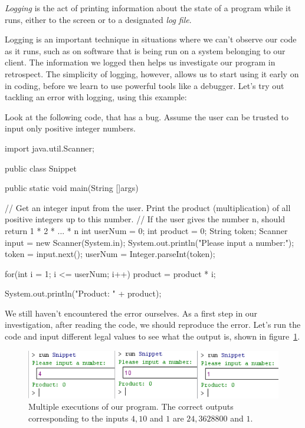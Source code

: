 \begin{definition}
\emph{Logging} is the act of printing information about the state of a program while it runs, either to the screen or to a designated \emph{log file}. 
\end{definition}

Logging is an important technique in situations where we can't observe our code as it runs, such as on software that is being run on a system belonging to our client. The information we logged then helps us investigate our program in retrospect. The simplicity of logging, however, allows us to start using it early on in coding, before we learn to use powerful tools like a debugger. Let's try out tackling an error with logging, using this example:

\begin{example}
Look at the following code, that has a bug. Assume the user can be trusted to input only positive integer numbers. 

\begin{code}
import java.util.Scanner;

public class Snippet{
    public static void main(String []args){
        // Get an integer input from the user. Print the product (multiplication) of all positive integers up to this number.
        // If the user gives the number n, should return 1 * 2 * ... * n
        int userNum = 0;
        int product = 0;
        String token;
        Scanner input = new Scanner(System.in);
        System.out.println("Please input a number:");
        token = input.next();
        userNum = Integer.parseInt(token);
        
        for(int i = 1; i <= userNum; i++){
            product = product * i;
        }
        
        System.out.println("Product: " + product);
    }
}
\end{code}

\end{example}

We still haven't encountered the error ourselves. As a first step in our investigation, after reading the code, we should reproduce the error. Let's run the code and input different legal values to see what the output is, shown in figure~\ref{fig:bug}.

\begin{figure}[h!]
\centering
\includegraphics[scale=0.8]{images/bug_outputs.png}
\caption{Multiple executions of our program. The correct outputs corresponding to the inputs $4,10$ and $1$ are $24, 3628800$ and $1$.}
\label{fig:bug}
\end{figure}

